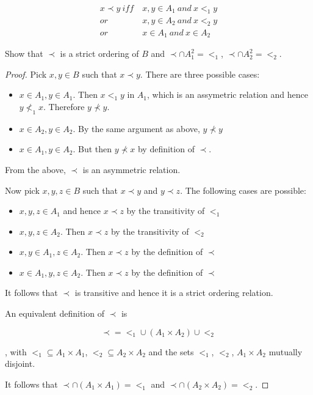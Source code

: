\begin{itemize}
\begin{align*}
    x \prec y~iff~ &x,y \in A_1~and~x<_1 y \\
                or~ & x,y \in A_2~and~x<_2y \\
                or~ & x \in A_1~and~x\in A_2
\end{align*}

Show that $\prec$ is a strict ordering of $B$ and $\prec \cap A_1^2 = <_1$, $\prec \cap A_2^2 = <_2$.

\begin{proof}
Pick $x,y \in B$ such that $x \prec y$. There are three possible cases:

\begin{itemize}
    \item $x \in A_1, y \in A_1$. Then $x <_1 y$ in $A_1$, which is an assymetric relation and hence $y \nless_1 x$. Therefore $y \nprec y$.
    \item $x \in A_2, y \in A_2$. By the same argument as above, $y \nprec y$
    \item $x \in A_1, y \in A_2$. But then $y \nprec x$ by definition of $\prec$.
\end{itemize}

From the above, $\prec$ is an asymmetric relation.

Now pick $x,y,z \in B$ such that $x \prec y$ and $y \prec z$. The following cases are possible:

\begin{itemize}
    \item $x,y,z \in A_1$ and hence $x \prec z$ by the transitivity of $<_1$
    \item $x,y,z \in A_2$. Then $x \prec z$ by the transitivity of $<_2$
    \item $x,y \in A_1, z \in A_2$. Then $x \prec z$ by the definition of $\prec$
    \item $x \in A_1, y,z \in A_2$. Then $x \prec z$ by the definition of $\prec$
\end{itemize}

It follows that $\prec$ is transitive and hence it is a strict ordering relation.

\vspace{1em}

An equivalent definition of $\prec$ is

$$ \prec = <_1 \cup (A_1 \times A_2) \cup <_2$$

, with $<_1 \subseteq A_1 \times A_1$, $<_2 \subseteq A_2 \times A_2$ and the sets $<_1$, $<_2$, $A_1 \times A_2$ mutually disjoint.

It follows that $\prec \cap (A_1 \times A_1) = <_1$ and $\prec \cap (A_2 \times A_2) = <_2$.

\end{proof}

\end{itemize}

\newpage

